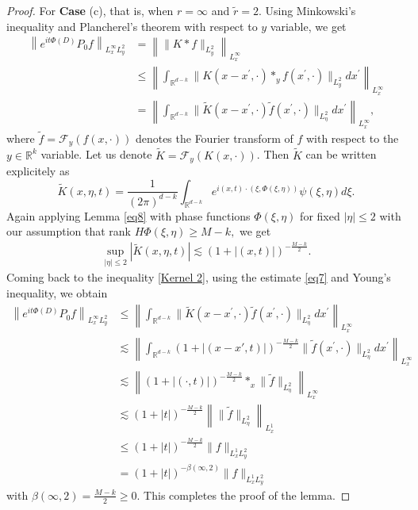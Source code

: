 \documentclass[a4paper,11pt, reqno]{amsart}
\theoremstyle{definition}
\theoremstyle{remark}
\numberwithin{equation}{section}
\begin{document}
\begin{proof}
		For \textbf{Case} (c), that is, when $r=\infty$ and $\tilde{r}=2$.  Using Minkowski's inequality and Plancherel's theorem with respect to $y$ variable, we get 
		\begin{align}\label{Kernel 2}\nonumber
			\left\|e^{i t\Phi(D)} P_0 f\right\|_{L_x^{\infty} L_y^2} & =\left\|\| K * f \|_{L_y^2}\right\|_{L_x^{\infty}} \\\nonumber
			& \leq\left\|\int_{\mathbb{R}^{d-k}} \| K\left(x-x^{\prime}, \cdot\right) *_y f\left(x^{\prime}, \cdot\right) \|_{L_y^2} d x^{\prime}\right\|_{L_x^{\infty}} \\
			& =\left\|\int_{\mathbb{R}^{d-k}} \| \widetilde{K}\left(x-x^{\prime}, \cdot\right) \tilde{f}\left(x^{\prime}, \cdot\right) \|_{L_\eta^2} d x^{\prime}\right\|_{L_x^{\infty}},
		\end{align}
		where  $\tilde{f}=\mathcal{F}_y(f(x, \cdot))$ denotes the  Fourier transform of $f$ with respect to  the   $y \in \mathbb{R}^k$ variable. Let us denote    $\tilde{K}=\mathcal{F}_y(K(x, \cdot))$. Then    $\tilde{K}$  can be written explicitely as 
		$$
		\widetilde{K}(x, \eta, t)=\frac{1}{(2 \pi)^{d-k}} \int_{\mathbb{R}^{d-k}} e^{i (x, t) \cdot (\xi, \Phi(\xi, \eta))} \psi(\xi, \eta) d \xi . 
		$$
		Again applying Lemma \ref{eq8} with phase functions $\Phi(\xi, \eta)$ for fixed $|\eta| \leq 2$ with our assumption  that  rank $H{\Phi}(\xi, \eta) \geq M-k,$ we  get
		\begin{align}\label{eq7}
			\sup _{|\eta| \leq 2}\left|\widetilde{K}(x, \eta, t)\right| \lesssim(1+|(x, t)|)^{-\frac{M-k}{2}} .
		\end{align}
	Coming back to the inequality \eqref{Kernel 2},	using  the estimate  \eqref{eq7} and   Young's inequality,  we obtain 
		$$
		\begin{aligned}
			\left\|e^{i t\Phi(D)} P_0 f\right\|_{L_x^{\infty} L_y^2} &\leq	\left\|\int_{\mathbb{R}^{d-k}} \| \widetilde{K}\left(x-x^{\prime}, \cdot\right) \tilde{f}\left(x^{\prime}, \cdot\right) \|_{L_\eta^2} d x^{\prime}\right\|_{L_x^{\infty}}\\
			&	\lesssim 	\left\|\int_{\mathbb{R}^{d-k}}  (1+|(x-x', t)|)^{-\frac{M-k}{2}}\|   \tilde{f}\left(x^{\prime}, \cdot\right) \|_{L_\eta^2} d x^{\prime}\right\|_{L_x^{\infty}}\\ & \lesssim\left\|(1+|(\cdot, t)|)^{-\frac{M-k}{2}} *_x \| \tilde{f} \|_{L_\eta^2}\right\|_{L_x^{\infty}} \\
			& \lesssim(1+|t|)^{-\frac{M-k}{2}}\left \| \| \tilde{f} \|_{L_\eta^2}\right\|_{L_x^1} \\
			& \leq(1+|t|)^{-\frac{M-k}{2}}\|f\|_{L_x^1 L_y^2}\\
			& =(1+|t|)^{-\beta(\infty, 2)}\|f\|_{L_x^1 L_y^2} 
		\end{aligned}
		$$
		with $ \beta(\infty, 2)=\frac{M-k}{2} \geq 0$. This completes the proof of the lemma.  
	\end{proof}
\end{document}
